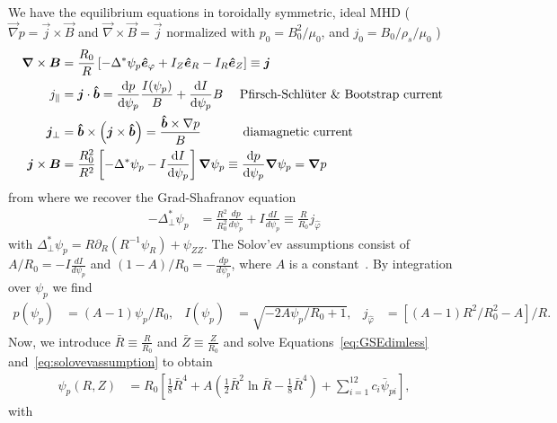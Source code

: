 We have the equilibrium equations in toroidally symmetric, ideal MHD (
$\vec\nabla p = \vec j\times \vec B$ and $\vec \nabla\times\vec B = \vec j$ normalized with $p_0 = B_0^2/\mu_0$, and $j_0 = B_0/\rho_s/\mu_0$ )
\begin{align}
    {\boldsymbol{\nabla}}\times {\boldsymbol{B}} &= \frac{R_0}{R}\left[ -\Delta^*\psi_p\bm{\hat{e}}_\varphi + I_Z \bm{\hat{e}}_R - I_R\bm{\hat{e}}_Z \right]\equiv {\boldsymbol{j}}\\
 j_\parallel &= {\boldsymbol{j}}\cdot \bm{\hat{b}} = \frac{\mathrm{d} p}{\mathrm{d}\psi_p} \frac{I(\psi_p)}{B} +
 \frac{\mathrm{d} I}{\mathrm{d}\psi_p} B \quad \text{  Pfirsch-Schl\"uter \& Bootstrap current } \\
 {\boldsymbol{j}}_\perp &= \bm{\hat{b}}\times\left({\boldsymbol{j}}\times\bm{\hat{b}}\right)=
 \frac{\bm{\hat{b}} \times \nabla p}{B} \quad\quad\quad \text{ diamagnetic current} \\
 {\boldsymbol{j}}\times{\boldsymbol{B}} &= \frac{R_0^2}{R^2}\left[ -\Delta^* \psi_p - I
     \frac{\mathrm{d} I}{\mathrm{d} \psi_p} \right]{\boldsymbol{\nabla}}\psi_p \equiv \frac{\mathrm{d} p}{\mathrm{d}\psi_p}{\boldsymbol{\nabla}}\psi_p ={\boldsymbol{\nabla}} p
\end{align}
from where we recover the Grad-Shafranov equation
\begin{align}\label{eq:GSEdimless}
    -\Delta^*_\perp  \psi_p &= \frac{R^2}{R_0^2} \frac{d p}{d  \psi_p } + I \frac{d I}{d  \psi_p } \equiv \frac{R}{R_0} j_{\hat\varphi}
\end{align}
with $\Delta^*_\perp \psi_p = R\partial_R (R^{-1}\psi_R) + \psi_{ZZ}$.
The Solov'ev assumptions consist of \(A/R_0 = -I \frac{d I}{d  \psi_p }\) and \((1-A)/R_0 = -\frac{d p}{d  \psi_p }\), where \(A\) is a constant~\cite{Cerfon2010,Cerfon2014}.
By integration over \(\psi_p\) we find
\begin{align}\label{eq:solovevassumption}
 p(\psi_p) &= (A-1)\psi_p/R_0,  &
 I(\psi_p) &= \sqrt{-2 A \psi_p/R_0 + 1}, &
    j_{\hat\varphi} &= \left[(A-1)R^2/R_0^2 - A \right]/R.
\end{align}
Now, we introduce \(\bar{R} \equiv \frac{R}{R_0}\) and \(\bar{Z} \equiv\frac{Z}{R_0}\)
and solve Equations~\eqref{eq:GSEdimless} and~\eqref{eq:solovevassumption} to obtain
\begin{align}\label{eq:solovev}
 \psi_p (R,Z) &= R_0 \left[ \frac{1}{8}\bar{R}^4 + A\left( \frac{1}{2} \bar{R}^2 \ln{\bar{R}} 
   - \frac{1}{8}\bar{R}^4\right) + \sum_{i=1}^{12} c_{i}  \bar{\psi}_{pi}\right],
\end{align}
with
